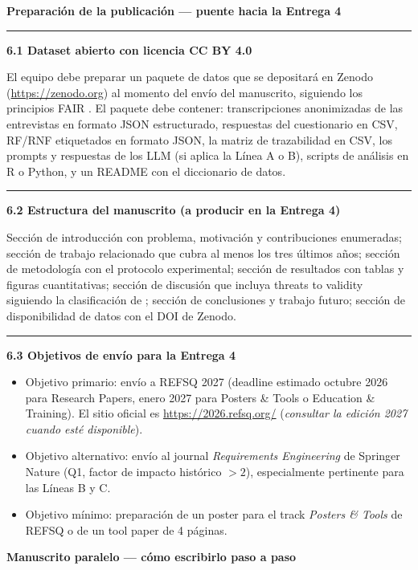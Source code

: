 \documentclass[11pt,a4paper]{article}
\newcounter{secc}
\newcommand{\secband}[1]{%
    \stepcounter{secc}\par\vspace{9pt}\noindent
    {\setlength{\fboxsep}{0pt}%
        \colorbox{uteqgold}{\parbox[c][20pt][c]{0.05\textwidth}{\centering\textbf{\color{white}\small \arabic{secc}}}}%
        \colorbox{uteqgreen}{\parbox[c][20pt][c]{0.95\textwidth}{\hspace{8pt}\textbf{\color{white}\small #1}}}%
    }\par\vspace{5pt}}
\newcommand{\submark}[1]{\par\vspace{4pt}\noindent
    {\color{uteqgreen}\rule[-1pt]{3.5pt}{12pt}}\hspace{6pt}\textbf{\color{uteqgreen}#1}\par\vspace{2pt}}
\begin{document}
\secband{Preparación de la publicación --- puente hacia la Entrega 4}

\submark{6.1 Dataset abierto con licencia CC BY 4.0}
El equipo debe preparar un paquete de datos que se depositará en Zenodo (\url{https://zenodo.org}) al momento del envío del manuscrito, siguiendo los principios FAIR \cite{wilkinson2016fair}.
El paquete debe contener: transcripciones anonimizadas de las entrevistas en formato JSON estructurado, respuestas del cuestionario en CSV, RF/RNF etiquetados en formato JSON, la matriz de trazabilidad en CSV, los prompts y respuestas de los LLM (si aplica la Línea A o B), scripts de análisis en R o Python, y un README con el diccionario de datos.

\submark{6.2 Estructura del manuscrito (a producir en la Entrega 4)}
Sección de introducción con problema, motivación y contribuciones enumeradas; sección de trabajo relacionado que cubra al menos los tres últimos años; sección de metodología con el protocolo experimental; sección de resultados con tablas y figuras cuantitativas; sección de discusión que incluya threats to validity siguiendo la clasificación de \cite{wohlin2012experimentation}; sección de conclusiones y trabajo futuro; sección de disponibilidad de datos con el DOI de Zenodo.

\submark{6.3 Objetivos de envío para la Entrega 4}
\begin{itemize}
    \item Objetivo primario: envío a REFSQ 2027 (deadline estimado octubre 2026 para Research Papers, enero 2027 para Posters \& Tools o Education \& Training). El sitio oficial es \url{https://2026.refsq.org/} (\emph{consultar la edición 2027 cuando esté disponible}).
    \item Objetivo alternativo: envío al journal \textit{Requirements Engineering} de Springer Nature (Q1, factor de impacto histórico $>2$), especialmente pertinente para las Líneas B y C.
    \item Objetivo mínimo: preparación de un poster para el track \emph{Posters \& Tools} de REFSQ o de un tool paper de 4 páginas.
\end{itemize}

\secband{Manuscrito paralelo --- cómo escribirlo paso a paso}
\end{document}
